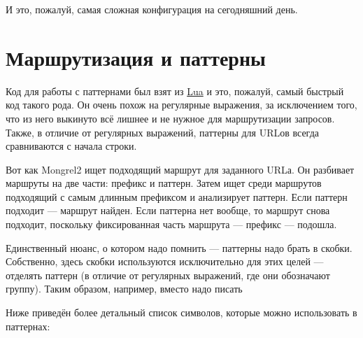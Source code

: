 И это, пожалуй, самая сложная конфигурация на сегодняшний день.


\section{Маршрутизация и паттерны}

Код для работы с паттернами был взят из
\href{http://www.lua.org/}{Lua} и это, пожалуй, самый быстрый код
такого рода. Он очень похож на регулярные выражения, за исключением
того, что из него выкинуто всё лишнее и не нужное для маршрутизации
запросов. Также, в отличие от регулярных выражений, паттерны для
URLов всегда сравниваются с начала строки.

Вот как Mongrel2 ищет подходящий маршрут для заданного URLа. Он
разбивает маршруты на две части: префикс и паттерн. Затем ищет среди
маршрутов подходящий с самым длинным префиксом и анализирует паттерн.
Если паттерн подходит --- маршрут найден. Если паттерна нет вообще, то
маршрут снова подходит, поскольку фиксированная часть маршрута ---
префикс --- подошла.

Единственный нюанс, о котором надо помнить --- паттерны надо брать в
скобки. Собственно, здесь скобки используются исключительно для этих
целей --- отделять паттерн (в отличие от регулярных выражений, где они
обозначают группу). Таким образом, например, вместо
 надо писать 

Ниже приведён более детальный список символов, которые можно
использовать в паттернах:

